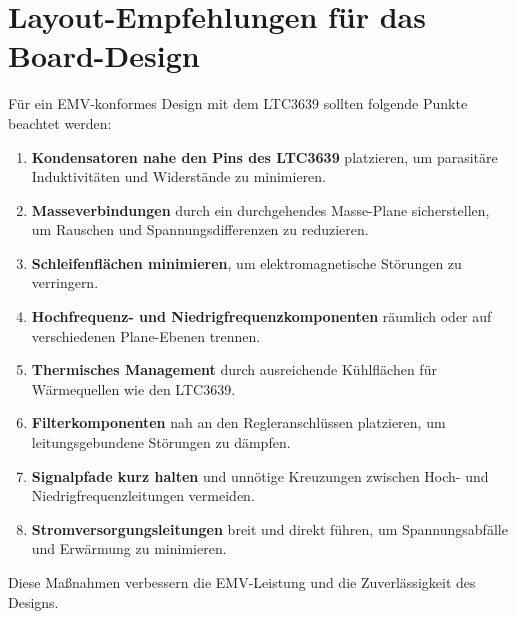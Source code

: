 \section{Layout-Empfehlungen für das Board-Design}\label{sec:Layout}

Für ein EMV-konformes Design mit dem LTC3639 sollten folgende Punkte beachtet werden:

\begin{enumerate}
    \item \textbf{Kondensatoren nahe den Pins des LTC3639} platzieren, um parasitäre Induktivitäten und Widerstände zu minimieren.
    \item \textbf{Masseverbindungen} durch ein durchgehendes Masse-Plane sicherstellen, um Rauschen und Spannungsdifferenzen zu reduzieren.
    \item \textbf{Schleifenflächen minimieren}, um elektromagnetische Störungen zu verringern.
    \item \textbf{Hochfrequenz- und Niedrigfrequenzkomponenten} räumlich oder auf verschiedenen Plane-Ebenen trennen.
    \item \textbf{Thermisches Management} durch ausreichende Kühlflächen für Wärmequellen wie den LTC3639.
    \item \textbf{Filterkomponenten} nah an den Regleranschlüssen platzieren, um leitungsgebundene Störungen zu dämpfen.
    \item \textbf{Signalpfade kurz halten} und unnötige Kreuzungen zwischen Hoch- und Niedrigfrequenzleitungen vermeiden.
    \item \textbf{Stromversorgungsleitungen} breit und direkt führen, um Spannungsabfälle und Erwärmung zu minimieren.
\end{enumerate}

Diese Maßnahmen verbessern die EMV-Leistung und die Zuverlässigkeit des Designs.

